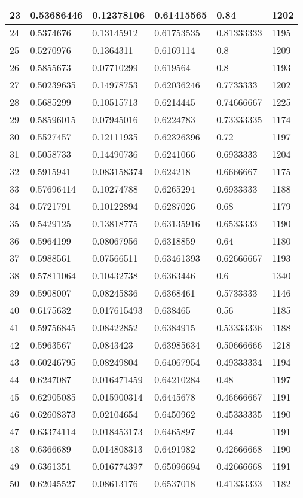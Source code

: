 \begin{longtable}{|l|l|l|l|l|l|}
23 & 0.53686446 & 0.12378106 & 0.61415565 & 0.84 & 1202 \\ \hline 
24 & 0.5374676 & 0.13145912 & 0.61753535 & 0.81333333 & 1195 \\ \hline 
25 & 0.5270976 & 0.1364311 & 0.6169114 & 0.8 & 1209 \\ \hline 
26 & 0.5855673 & 0.07710299 & 0.619564 & 0.8 & 1193 \\ \hline 
27 & 0.50239635 & 0.14978753 & 0.62036246 & 0.7733333 & 1202 \\ \hline 
28 & 0.5685299 & 0.10515713 & 0.6214445 & 0.74666667 & 1225 \\ \hline 
29 & 0.58596015 & 0.07945016 & 0.6224783 & 0.73333335 & 1174 \\ \hline 
30 & 0.5527457 & 0.12111935 & 0.62326396 & 0.72 & 1197 \\ \hline 
31 & 0.5058733 & 0.14490736 & 0.6241066 & 0.6933333 & 1204 \\ \hline 
32 & 0.5915941 & 0.083158374 & 0.624218 & 0.6666667 & 1175 \\ \hline 
33 & 0.57696414 & 0.10274788 & 0.6265294 & 0.6933333 & 1188 \\ \hline 
34 & 0.5721791 & 0.10122894 & 0.6287026 & 0.68 & 1179 \\ \hline 
35 & 0.5429125 & 0.13818775 & 0.63135916 & 0.6533333 & 1190 \\ \hline 
36 & 0.5964199 & 0.08067956 & 0.6318859 & 0.64 & 1180 \\ \hline 
37 & 0.5988561 & 0.07566511 & 0.63461393 & 0.62666667 & 1193 \\ \hline 
38 & 0.57811064 & 0.10432738 & 0.6363446 & 0.6 & 1340 \\ \hline 
39 & 0.5908007 & 0.08245836 & 0.6368461 & 0.5733333 & 1146 \\ \hline 
40 & 0.6175632 & 0.017615493 & 0.638465 & 0.56 & 1185 \\ \hline 
41 & 0.59756845 & 0.08422852 & 0.6384915 & 0.53333336 & 1188 \\ \hline 
42 & 0.5963567 & 0.0843423 & 0.63985634 & 0.50666666 & 1218 \\ \hline 
43 & 0.60246795 & 0.08249804 & 0.64067954 & 0.49333334 & 1194 \\ \hline 
44 & 0.6247087 & 0.016471459 & 0.64210284 & 0.48 & 1197 \\ \hline 
45 & 0.62905085 & 0.015900314 & 0.6445678 & 0.46666667 & 1191 \\ \hline 
46 & 0.62608373 & 0.02104654 & 0.6450962 & 0.45333335 & 1190 \\ \hline 
47 & 0.63374114 & 0.018453173 & 0.6465897 & 0.44 & 1191 \\ \hline 
48 & 0.6366689 & 0.014808313 & 0.6491982 & 0.42666668 & 1190 \\ \hline 
49 & 0.6361351 & 0.016774397 & 0.65096694 & 0.42666668 & 1191 \\ \hline 
50 & 0.62045527 & 0.08613176 & 0.6537018 & 0.41333333 & 1182 \\ \hline 
\end{longtable}